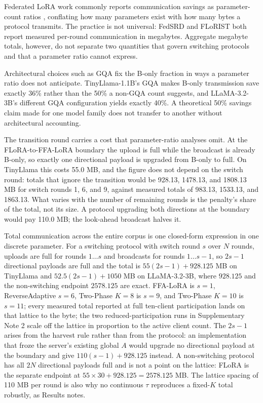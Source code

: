 \documentclass[pdflatex,sn-nature,lineno]{sn-jnl}
\begin{document}
\label{sec:measuredbytes}
Federated LoRA work commonly reports communication savings as parameter-count ratios \cite{zhang2024federatedgpt,sun2024ffalora,wang2024flora,bai2024flexlora}, conflating how many parameters exist with how many bytes a protocol transmits. The practice is not universal: FedSRD \cite{yan2026fedsrd} and FLoRIST \cite{ramesh2026florist} both report measured per-round communication in megabytes. Aggregate megabyte totals, however, do not separate two quantities that govern switching protocols and that a parameter ratio cannot express.

Architectural choices such as GQA fix the B-only fraction in ways a parameter ratio does not anticipate. TinyLlama-1.1B's GQA makes B-only transmission save exactly 36\% rather than the 50\% a non-GQA count suggests, and LLaMA-3.2-3B's different GQA configuration yields exactly 40\%. A theoretical 50\% savings claim made for one model family does not transfer to another without architectural accounting.

The transition round carries a cost that parameter-ratio analyses omit. At the FLoRA-to-FFA-LoRA boundary the upload is full while the broadcast is already B-only, so exactly one directional payload is upgraded from B-only to full. On TinyLlama this costs 55.0 MB, and the figure does not depend on the switch round: totals that ignore the transition would be 928.13, 1478.13, and 1808.13 MB for switch rounds 1, 6, and 9, against measured totals of 983.13, 1533.13, and 1863.13. What varies with the number of remaining rounds is the penalty's share of the total, not its size. A protocol upgrading both directions at the boundary would pay 110.0 MB; the look-ahead broadcast halves it.

Total communication across the entire corpus is one closed-form expression in one discrete parameter. For a switching protocol with switch round $s$ over $N$ rounds, uploads are full for rounds $1 \ldots s$ and broadcasts for rounds $1 \ldots s{-}1$, so $2s-1$ directional payloads are full and the total is $55(2s-1) + 928.125$ MB on TinyLlama and $52.5(2s-1) + 1050$ MB on LLaMA-3.2-3B, where $928.125$ and the non-switching endpoint $2578.125$ are exact. FFA-LoRA is $s{=}1$, ReverseAdaptive $s{=}6$, Two-Phase $K{=}8$ is $s{=}9$, and Two-Phase $K{=}10$ is $s{=}11$; every measured total reported at full ten-client participation lands on that lattice to the byte; the two reduced-participation runs in Supplementary Note 2 scale off the lattice in proportion to the active client count. The $2s-1$ arises from the harvest rule rather than from the protocol: an implementation that froze the server's existing global $A$ would upgrade no directional payload at the boundary and give $110(s-1) + 928.125$ instead. A non-switching protocol has all $2N$ directional payloads full and is not a point on the lattice: FLoRA is the separate endpoint at $55 \times 30 + 928.125 = 2578.125$ MB. The lattice spacing of 110 MB per round is also why no continuous $\tau$ reproduces a fixed-$K$ total robustly, as Results notes.
\end{document}
